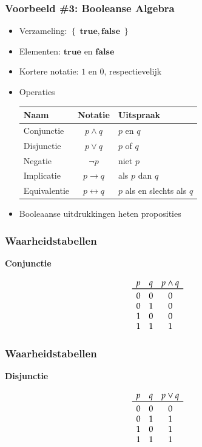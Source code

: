 \documentclass[dutch]{../khlslides}
\newcommand{\AND}{\wedge}
\newcommand{\OR}{\vee}
\newcommand{\IMPLIES}{\rightarrow}
\newcommand{\IFF}{\leftrightarrow}
\newcommand{\NOT}{\neg}
\begin{document}
\begin{frame}
  \frametitle{Voorbeeld \#3: Booleanse Algebra}
  \begin{itemize}
    \item Verzameling: $\left\{ \; \mathbf{true}, \mathbf{false} \; \right\}$
    \item Elementen: $\mathbf{true}$ en $\mathbf{false}$
    \item Kortere notatie: $1$ en $0$, respectievelijk
    \item Operaties
          \begin{center}
            \begin{tabular}{lcl}
              \bf Naam & \bf Notatie & \bf Uitspraak \\
              \toprule
              Conjunctie & $p \AND  q$ & $p$ en $q$ \\
              Disjunctie & $p \OR  q$ & $p$ of $q$ \\
              Negatie & $\NOT p$ & niet $p$ \\ 
              Implicatie & $p \IMPLIES  q$ & als $p$ dan $q$ \\
              Equivalentie & $p \IFF  q$ & $p$ als en slechts als $q$
            \end{tabular}
          \end{center}
          \vskip2mm
    \item Booleaanse uitdrukkingen heten proposities
  \end{itemize}
\end{frame}

\begin{frame}
  \frametitle{Waarheidstabellen}
  \begin{center}
    \Large\bf Conjunctie
  \end{center}
  \Large
  \[
    \begin{array}{ccc}
      p & q & p \AND q \\
      \toprule
      0 & 0 & 0 \\
      0 & 1 & 0 \\
      1 & 0 & 0 \\
      1 & 1 & 1 \\
    \end{array}
  \]
\end{frame}

\begin{frame}
  \frametitle{Waarheidstabellen}
  \begin{center}
    \Large\bf Disjunctie
  \end{center}
  \Large
  \[
    \begin{array}{ccc}
      p & q & p \OR q \\
      \toprule
      0 & 0 & 0 \\
      0 & 1 & 1 \\
      1 & 0 & 1 \\
      1 & 1 & 1 \\
    \end{array}
  \]
\end{frame}
\end{document}
